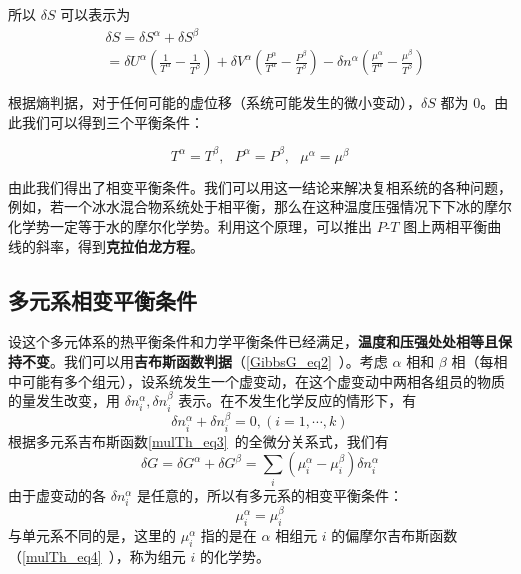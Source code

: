 所以 $\delta S$ 可以表示为
\begin{equation}
\begin{aligned}
&\delta S=\delta S^\alpha+\delta S^\beta\\&=\delta U^\alpha\left(\frac{1}{T^\alpha}-\frac{1}{T^\beta}\right)+\delta V^\alpha\left(\frac{P^\alpha}{T^\alpha}-\frac{P^\beta}{T^\beta}\right)
-\delta n^\alpha\left(\frac{\mu^\alpha}{T^\alpha}-\frac{\mu^\beta}{T^\beta}\right)
\end{aligned}
\end{equation}

根据熵判据，对于任何可能的虚位移（系统可能发生的微小变动），$\delta S$ 都为 $0$。由此我们可以得到三个平衡条件：

\begin{equation}
T^\alpha=T^\beta,\ \ \ P^\alpha=P^\beta,\ \ \ \mu^\alpha=\mu^\beta
\end{equation}

由此我们得出了相变平衡条件。我们可以用这一结论来解决复相系统的各种问题，例如，若一个冰水混合物系统处于相平衡，那么在这种温度压强情况下下冰的摩尔化学势一定等于水的摩尔化学势。利用这个原理，可以推出 $P$-$T$ 图上两相平衡曲线的斜率，得到\textbf{克拉伯龙方程}。

\subsection{多元系相变平衡条件}

设这个多元体系的热平衡条件和力学平衡条件已经满足，\textbf{温度和压强处处相等且保持不变}。我们可以用\textbf{吉布斯函数判据}（\autoref{GibbsG_eq2}~）。考虑 $\alpha$ 相和 $\beta$ 相（每相中可能有多个组元），设系统发生一个虚变动，在这个虚变动中两相各组员的物质的量发生改变，用 $\delta n_i^\alpha,\delta n_i^\beta$ 表示。在不发生化学反应的情形下，有
\begin{equation}
\delta n_i^\alpha+\delta n_i^\beta=0,(i=1,\cdots,k)
\end{equation}
根据多元系吉布斯函数\autoref{mulTh_eq3}~的全微分关系式，我们有
\begin{equation}
\delta G=\delta G^\alpha+\delta G^\beta=\sum_i (\mu_i^\alpha-\mu_i^\beta)\delta n_i^\alpha
\end{equation}
由于虚变动的各 $\delta n_i^\alpha$ 是任意的，所以有多元系的相变平衡条件：
\begin{equation}
\mu_i^\alpha=\mu_i^\beta
\end{equation}
与单元系不同的是，这里的 $\mu_i^\alpha$ 指的是在 $\alpha$ 相组元 $i$ 的偏摩尔吉布斯函数（\autoref{mulTh_eq4}~），称为组元 $i$ 的化学势。

